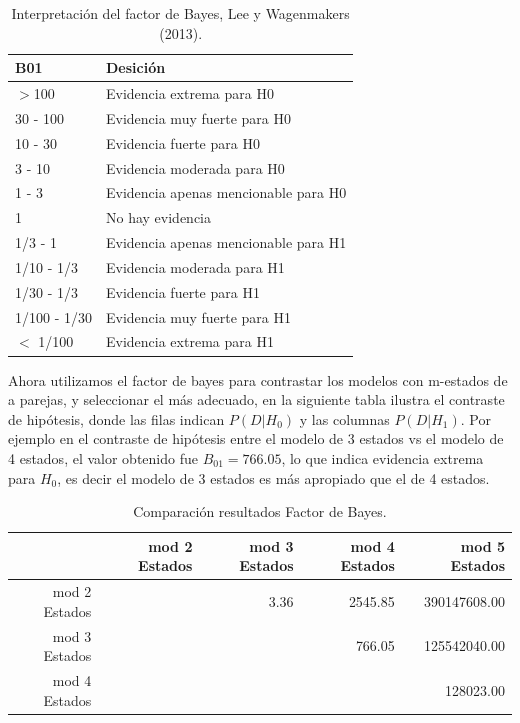 \documentclass[a4paper]{article}\usepackage[]{graphicx}\usepackage[]{color}
\begin{document}
\begin{table}[ht]
\centering
\begin{tabular}{ll}
  \hline
B01 & Desición \\ 
  \hline
$>$100 & Evidencia extrema para H0 \\ 
  30 - 100 & Evidencia muy fuerte para H0 \\ 
  10 - 30 & Evidencia fuerte para H0 \\ 
  3 - 10 & Evidencia moderada para H0 \\ 
  1 - 3 & Evidencia apenas mencionable para H0 \\ 
  1 & No hay evidencia \\ 
  1/3 - 1 & Evidencia apenas mencionable para H1 \\ 
  1/10 - 1/3 & Evidencia moderada para H1 \\ 
  1/30 - 1/3 & Evidencia fuerte para H1 \\ 
  1/100 - 1/30 & Evidencia muy fuerte para H1 \\ 
  $<$ 1/100 & Evidencia extrema para H1 \\ 
   \hline
\end{tabular}
\caption{Interpretación del factor de Bayes, Lee y Wagenmakers (2013).} 
\end{table}


Ahora utilizamos el factor de bayes para contrastar los modelos con m-estados de a parejas, y seleccionar el más adecuado, en la siguiente tabla ilustra el contraste de hipótesis, donde las filas indican $P(D | H_0)$ y las columnas $P(D | H_1)$. Por ejemplo en el contraste de hipótesis entre el modelo de 3 estados vs el modelo de 4 estados, el valor obtenido fue $B_{01} = 766.05$, lo que indica evidencia extrema para $H_0$, es decir el modelo de 3 estados es más apropiado que el de 4 estados.

\begin{table}[ht]
\centering
\begin{tabular}{rrrrr}
  \hline
 & mod 2 Estados & mod 3 Estados & mod 4 Estados & mod 5 Estados \\ 
  \hline
mod 2 Estados &  & 3.36 & 2545.85 & 390147608.00 \\ 
  mod 3 Estados &  &  & 766.05 & 125542040.00 \\ 
  mod 4 Estados &  &  &  & 128023.00 \\ 
   \hline
\end{tabular}
\caption{Comparación resultados Factor de Bayes.} 
\end{table}
\end{document}
